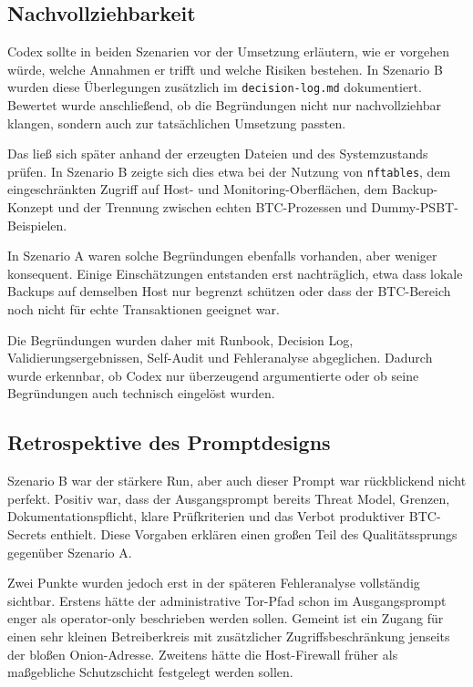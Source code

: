 \subsection{Nachvollziehbarkeit}

Codex sollte in beiden Szenarien vor der Umsetzung erläutern, wie er vorgehen würde, welche Annahmen er trifft und welche Risiken bestehen. In Szenario B wurden diese Überlegungen zusätzlich im \texttt{decision-log.md} dokumentiert. Bewertet wurde anschließend, ob die Begründungen nicht nur nachvollziehbar klangen, sondern auch zur tatsächlichen Umsetzung passten.\cite{decisionlogB}

Das ließ sich später anhand der erzeugten Dateien und des Systemzustands prüfen. In Szenario B zeigte sich dies etwa bei der Nutzung von \texttt{nftables}, dem eingeschränkten Zugriff auf Host- und Monitoring-Oberflächen, dem Backup-Konzept und der Trennung zwischen echten \ac{BTC}-Prozessen und Dummy-\ac{PSBT}-Beispielen.

In Szenario A waren solche Begründungen ebenfalls vorhanden, aber weniger konsequent. Einige Einschätzungen entstanden erst nachträglich, etwa dass lokale Backups auf demselben Host nur begrenzt schützen oder dass der \ac{BTC}-Bereich noch nicht für echte Transaktionen geeignet war.

Die Begründungen wurden daher mit Runbook, Decision Log, Validierungsergebnissen, Self-Audit und Fehleranalyse abgeglichen. Dadurch wurde erkennbar, ob Codex nur überzeugend argumentierte oder ob seine Begründungen auch technisch eingelöst wurden.


\subsection{Retrospektive des Promptdesigns}

Szenario B war der stärkere Run, aber auch dieser Prompt war rückblickend nicht perfekt. Positiv war, dass der Ausgangsprompt bereits Threat Model, Grenzen, Dokumentationspflicht, klare Prüfkriterien und das Verbot produktiver \ac{BTC}-Secrets enthielt. Diese Vorgaben erklären einen großen Teil des Qualitätssprungs gegenüber Szenario A.

Zwei Punkte wurden jedoch erst in der späteren Fehleranalyse vollständig sichtbar. Erstens hätte der administrative Tor-Pfad schon im Ausgangsprompt enger als \glqq operator-only\grqq{} beschrieben werden sollen. Gemeint ist ein Zugang für einen sehr kleinen Betreiberkreis mit zusätzlicher Zugriffsbeschränkung jenseits der bloßen Onion-Adresse. Zweitens hätte die Host-Firewall früher als maßgebliche Schutzschicht festgelegt werden sollen.


